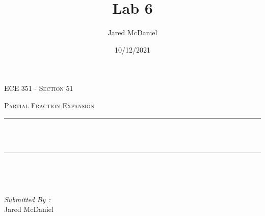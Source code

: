 \documentclass[12pt]{report}
\title{Lab 6}
\author{ Jared McDaniel}
\date{10/12/2021}
\makeatletter
\let\thetitle\@title
\makeatother
\begin{document}

\begin{titlepage}
	\centering
    \vspace*{0.5 cm}
\begin{center}    \textsc{\Large   ECE 351 - Section 51 }\\[2.0 cm]	\end{center}%
	\textsc{\Large Partial Fraction Expansion  }\\[0.5 cm]				%
	\rule{\linewidth}{0.2 mm} \\[0.4 cm]
	{ \huge \bfseries \thetitle}\\
	\rule{\linewidth}{0.2 mm} \\[1.5 cm]
	
	\begin{minipage}{0.4\textwidth}
		\begin{flushleft} \large
			\end{flushleft}
			\end{minipage}~
			\begin{minipage}{0.4\textwidth}
            
			\begin{flushright} \large
			\emph{Submitted By :} \\
			Jared McDaniel  
		\end{flushright}
           
	\end{minipage}\\[2 cm]
	
    
    
    
    
	
\end{titlepage}


\tableofcontents
\pagebreak

\renewcommand{\thesection}{\arabic{section}}
\end{document}
